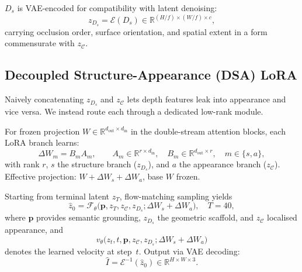 $D_s$ is VAE-encoded for compatibility with latent denoising:
\begin{equation}
  z_{D_s} = \mathcal{E}(D_s) \in \mathbb{R}^{(H/f) \times (W/f) \times c},
\end{equation}
carrying occlusion order, surface orientation, and spatial extent in a form commensurate with $z_{\mathcal{C}}$.

\subsection{Decoupled Structure-Appearance (DSA) LoRA}
Naively concatenating $z_{D_s}$ and $z_{\mathcal{C}}$ lets depth features leak into appearance and vice versa. We instead route each through a dedicated low-rank module.

For frozen projection $W \in \mathbb{R}^{d_{\mathrm{out}} \times d_{\mathrm{in}}}$ in the double-stream attention blocks, each LoRA branch learns:
\begin{equation}
  \Delta W_m = B_m A_m, \qquad
  A_m \in \mathbb{R}^{r \times d_{\mathrm{in}}}, \quad
  B_m \in \mathbb{R}^{d_{\mathrm{out}} \times r}, \quad
  m \in \{s,a\},
\end{equation}
with rank $r$, $s$ the structure branch ($z_{D_s}$), and $a$ the appearance branch ($z_{\mathcal{C}}$). Effective projection: $W + \Delta W_s + \Delta W_a$, base $W$ frozen.

Starting from terminal latent $z_T$, flow-matching sampling yields
\begin{equation}
  \hat{z}_0 = \mathcal{F}_\theta\bigl(\mathbf{p}, z_T, z_{\mathcal{C}},
  z_{D_s}; \Delta W_s + \Delta W_a\bigr), \quad T{=}40,
\end{equation}
where $\mathbf{p}$ provides semantic grounding, $z_{D_s}$ the
geometric scaffold, and $z_{\mathcal{C}}$ localised appearance, and
\begin{equation}
  v_\theta\bigl(z_t, t, \mathbf{p}, z_{\mathcal{C}}, z_{D_s};
  \Delta W_s + \Delta W_a\bigr)
\end{equation}
denotes the learned velocity at step~$t$. Output via VAE decoding:
\begin{equation}
  \hat{I} = \mathcal{E}^{-1}(\hat{z}_0) \in \mathbb{R}^{H \times W \times 3}.
\end{equation}

